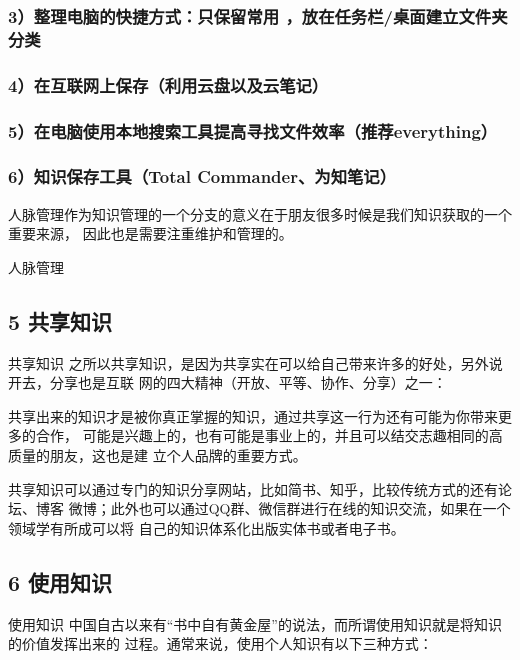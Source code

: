 \documentclass[11pt]{ctexart}
\begin{document}
{{{{\subsubsection{3）整理电脑的快捷方式：只保留常用 ，放在任务栏/桌面建立文件夹分类}
\label{sec:org40fd922}

\subsubsection{4）在互联网上保存（利用云盘以及云笔记）}
\label{sec:org3eb8790}

\subsubsection{5）在电脑使用本地搜索工具提高寻找文件效率（推荐everything）}
\label{sec:orgfd7722d}

\subsubsection{6）知识保存工具（Total Commander、为知笔记）}
\label{sec:org2bb424a}
人脉管理作为知识管理的一个分支的意义在于朋友很多时候是我们知识获取的一个重要来源，
因此也是需要注重维护和管理的。


人脉管理
\subsection{5 共享知识}
\label{sec:orgad1a7d4}

共享知识
之所以共享知识，是因为共享实在可以给自己带来许多的好处，另外说开去，分享也是互联
网的四大精神（开放、平等、协作、分享）之一：

共享出来的知识才是被你真正掌握的知识，通过共享这一行为还有可能为你带来更多的合作，
可能是兴趣上的，也有可能是事业上的，并且可以结交志趣相同的高质量的朋友，这也是建
立个人品牌的重要方式。

共享知识可以通过专门的知识分享网站，比如简书、知乎，比较传统方式的还有论坛、博客
微博；此外也可以通过QQ群、微信群进行在线的知识交流，如果在一个领域学有所成可以将
自己的知识体系化出版实体书或者电子书。
\subsection{6 使用知识}
\label{sec:org8190f2f}



使用知识
中国自古以来有“书中自有黄金屋”的说法，而所谓使用知识就是将知识的价值发挥出来的
过程。通常来说，使用个人知识有以下三种方式：

}}}}
\end{document}
